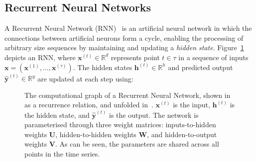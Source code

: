 


\subsection{Recurrent Neural Networks}

A Recurrent Neural Network (RNN)~\cite{Graves2012} is an artificial neural network in which the connections between artificial neurons form a cycle, enabling the processing of arbitrary size sequences by maintaining and updating a \emph{hidden state}. Figure~\ref{fig:rnn} depicts an RNN, where $\bm{x}^{(t)} \in \mathbb{R}^d$ represents point $t \in \tau$ in a sequence of inputs $\bm{x} = \left( \bm{x}^{(1)}, \ldots, \bm{x}^{(\tau)} \right)$. The hidden states $\bm{h}^{(t)} \in \mathbb{R}^h$ and predicted output $\bm{\hat{y}}^{(t)} \in \mathbb{R}^y$ are updated at each step using:

\begin{figure}
  \centering
  \hspace{1cm}
  \caption[Recurrent Neural Network architecture]{%
    The computational graph of a Recurrent Neural Network, shown in~\protect{} as a recurrence relation, and unfolded in~\protect{}. $\bm{x}^{(t)}$ is the input, $\bm{h}^{(t)}$ is the hidden state, and $\bm{\hat{y}}^{(t)}$ is the output. The network is parameterised through three weight matrices: inputs-to-hidden weights $\bm{U}$, hidden-to-hidden weights $\bm{W}$, and hidden-to-output weights $\bm{V}$. As can be seen, the parameters are shared across all points in the time series.%
  }%
  \label{fig:rnn}
\end{figure}

